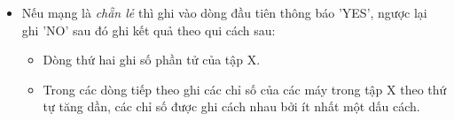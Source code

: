 \begin{itemize}
	\item     Nếu mạng là    \emph{     chẵn lẻ    }    thì ghi vào dòng đầu tiên thông báo 'YES', ngược lại ghi 'NO' sau đó ghi kết quả theo qui cách sau:    
\begin{itemize}
	\item       Dòng thứ hai ghi số phần tử của tập X.     
	\item       Trong các dòng tiếp theo ghi các chỉ số của các máy trong tập X theo thứ tự tăng dần, các chỉ số được ghi cách nhau bởi ít nhất một dấu cách.     
\end{itemize}
\end{itemize}

\